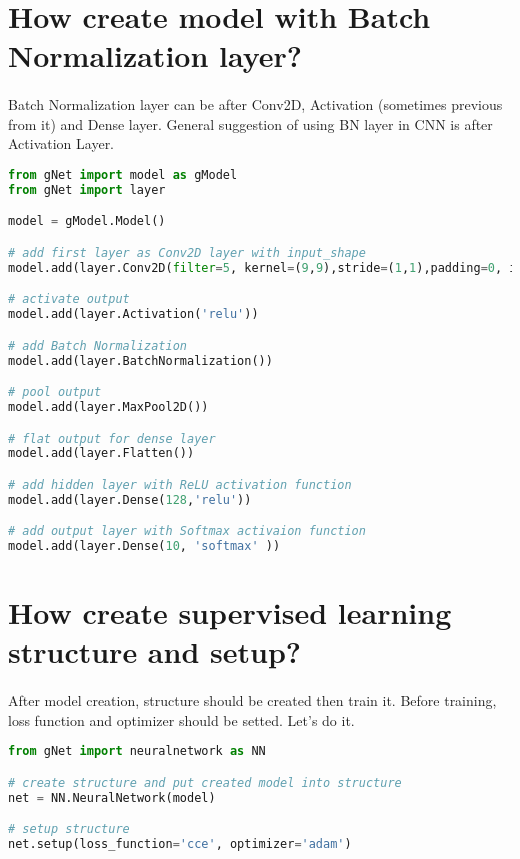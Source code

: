 \documentclass[12pt]{report}
\begin{document}
\section{How create model with Batch Normalization layer?}
\paragraph{}
Batch Normalization layer can be after Conv2D, Activation (sometimes previous from it) and Dense layer. General suggestion of using BN layer in CNN is after Activation Layer. 

\begin{lstlisting}[language=Python, numbers=none, caption={Create model with Batch Normalization.}, label={ex:create-bn-model}]
from gNet import model as gModel
from gNet import layer

model = gModel.Model()

# add first layer as Conv2D layer with input_shape
model.add(layer.Conv2D(filter=5, kernel=(9,9),stride=(1,1),padding=0, input_shape=x_train.shape[1:], use_bias=True))

# activate output
model.add(layer.Activation('relu'))

# add Batch Normalization
model.add(layer.BatchNormalization())

# pool output
model.add(layer.MaxPool2D())

# flat output for dense layer
model.add(layer.Flatten())

# add hidden layer with ReLU activation function
model.add(layer.Dense(128,'relu'))

# add output layer with Softmax activaion function 
model.add(layer.Dense(10, 'softmax' ))

\end{lstlisting}



\section{How create supervised learning structure and setup?}
\paragraph{}
After model creation, structure should be created then train it. Before training, loss function and optimizer should be setted. Let's do it.

\begin{lstlisting}[language=Python, numbers=none, caption={Set loss function and optimizer.}, label={ex:setup}]
from gNet import neuralnetwork as NN

# create structure and put created model into structure
net = NN.NeuralNetwork(model)

# setup structure
net.setup(loss_function='cce', optimizer='adam')

\end{lstlisting}
\end{document}
